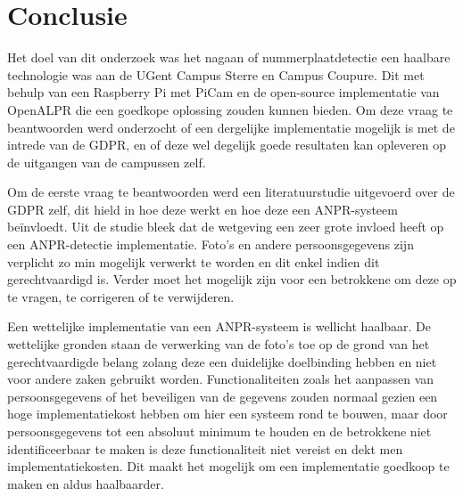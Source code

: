 
\chapter{Conclusie}
\label{ch:conclusie}


Het doel van dit onderzoek was het nagaan of nummerplaatdetectie een haalbare technologie was aan de UGent Campus Sterre en Campus Coupure. Dit met behulp van een Raspberry Pi met PiCam en de open-source implementatie van OpenALPR die een goedkope oplossing zouden kunnen bieden. Om deze vraag te beantwoorden werd onderzocht of een dergelijke implementatie mogelijk is met de intrede van de GDPR, en of deze wel degelijk goede resultaten kan opleveren op de uitgangen van de campussen zelf.

Om de eerste vraag te beantwoorden werd een literatuurstudie uitgevoerd over de GDPR zelf, dit hield in hoe deze werkt en hoe deze een ANPR-systeem beïnvloedt. Uit de studie bleek dat de wetgeving een zeer grote invloed heeft op een ANPR-detectie implementatie. Foto's en andere persoonsgegevens zijn verplicht zo min mogelijk verwerkt te worden en dit enkel indien dit gerechtvaardigd is. Verder moet het mogelijk zijn voor een betrokkene om deze op te vragen, te corrigeren of te verwijderen.

Een wettelijke implementatie van een ANPR-systeem is wellicht haalbaar. De wettelijke gronden staan de verwerking van de foto's toe op de grond van het gerechtvaardigde belang zolang deze een duidelijke doelbinding hebben en niet voor andere zaken gebruikt worden. Functionaliteiten zoals het aanpassen van persoonsgegevens of het beveiligen van de gegevens zouden normaal gezien een hoge implementatiekost hebben om hier een systeem rond te bouwen, maar door persoonsgegevens tot een absoluut minimum te houden en de betrokkene niet identificeerbaar te maken is deze functionaliteit niet vereist en dekt men implementatiekosten. Dit maakt het mogelijk om een implementatie goedkoop te maken en aldus haalbaarder.

